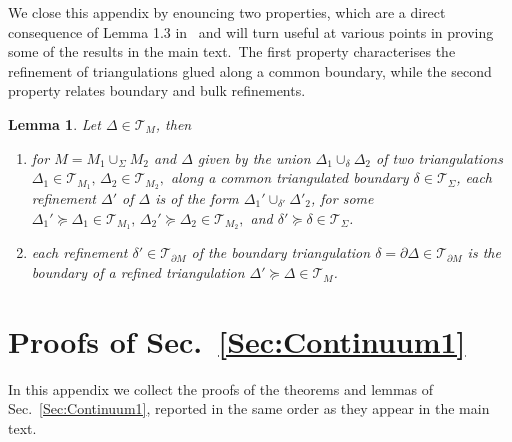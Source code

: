 \documentclass[11pt]{article}
\newcommand{\del}{\partial}
\newtheorem{lemma}[proposition]{Lemma}
\theoremstyle{definition}
\numberwithin{equation}{section}
\begin{document}
\noindent
We close this appendix by enouncing two properties, which are a direct consequence of Lemma 1.3 in~\cite{Hudson_1969} and will turn useful at various points in proving some of the results in the main text.~The first property characterises the refinement of triangulations glued along a common boundary, while the second property relates boundary and bulk refinements.
\begin{lemma}
\label{lem:guess}
    Let $\Delta\in\mathcal{T}_M$, then
    \begin{enumerate}
        \item for $M=M_1\cup_{\Sigma}M_2$ and $\Delta$ given by the union $\Delta_1\cup_{\delta}\Delta_2$ of two triangulations $\Delta_1\in\mathcal{T}_{M_1},\,\Delta_2\in\mathcal{T}_{M_2},$ along a common triangulated boundary $\delta\in\mathcal{T}_{\Sigma}$, each refinement $\Delta'$ of $\Delta$ is of the form $\Delta_1'\cup_{\delta'}\Delta'_2$, for some $\Delta_1'\succeq\Delta_1\in\mathcal{T}_{M_1},\,\Delta_2'\succeq\Delta_2\in\mathcal{T}_{M_2},$ and $\delta'\succeq\delta\in\mathcal{T}_{\Sigma}$.
        \item each refinement $\delta'\in\mathcal{T}_{\del M}$ of the boundary triangulation $\delta=\del\Delta\in\mathcal{T}_{\del M}$ is the boundary of a refined triangulation $\Delta'\succeq\Delta\in\mathcal{T}_M$.
    \end{enumerate}
\end{lemma}

\section{Proofs of Sec.~\ref{Sec:Continuum1}}\label{App:Proofs1}
In this appendix we collect the proofs of the theorems and lemmas of Sec.~\ref{Sec:Continuum1}, reported in the same order as they appear in the main text.
\end{document}

